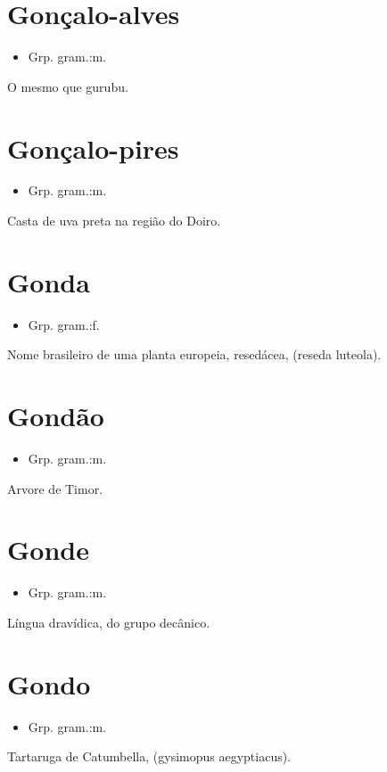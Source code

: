 \section{Gonçalo-alves}
\begin{itemize}
\item {Grp. gram.:m.}
\end{itemize}
O mesmo que \textunderscore gurubu\textunderscore .
\section{Gonçalo-pires}
\begin{itemize}
\item {Grp. gram.:m.}
\end{itemize}
Casta de uva preta na região do Doiro.
\section{Gonda}
\begin{itemize}
\item {Grp. gram.:f.}
\end{itemize}
Nome brasileiro de uma planta europeia, resedácea, (\textunderscore reseda luteola\textunderscore ).
\section{Gondão}
\begin{itemize}
\item {Grp. gram.:m.}
\end{itemize}
Arvore de Timor.
\section{Gonde}
\begin{itemize}
\item {Grp. gram.:m.}
\end{itemize}
Língua dravídica, do grupo decânico.
\section{Gondo}
\begin{itemize}
\item {Grp. gram.:m.}
\end{itemize}
Tartaruga de Catumbella, (\textunderscore gysimopus aegyptiacus\textunderscore ).
